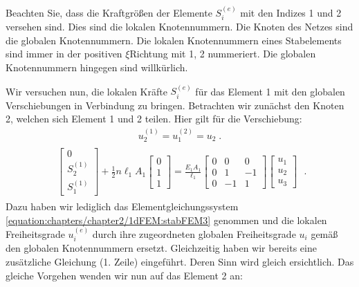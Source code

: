 \documentclass[letterpaper,10pt,german]{jupyterBook}
\begin{document}
\sphinxAtStartPar
Beachten Sie, dass die Kraftgrößen der Elemente \(S_i^{(e)}\) mit den Indizes 1 und 2 versehen sind. Dies sind die lokalen Knotennummern. Die Knoten des Netzes sind die globalen Knotennummern. Die lokalen Knotennummern eines Stabelements sind immer in der positiven \(\xi\)\sphinxhyphen{}Richtung mit 1, 2 nummeriert. Die globalen Knotennummern hingegen sind willkürlich.

\sphinxAtStartPar
Wir versuchen nun, die lokalen Kräfte \(S_i^{(e)}\) für das Element 1 mit den globalen Verschiebungen in Verbindung zu bringen. Betrachten wir zunächst den Knoten 2, welchen sich Element 1 und 2 teilen. Hier gilt für die Verschiebung:
\label{equation:chapters/chapter2/1dFEM:3deffa07-4eeb-4983-93bb-bf8bba989f7c}\begin{align}
  u_2^{(1)} = u_1^{(2)} = u_2 \; .
\end{align}\begin{equation}\label{equation:chapters/chapter2/1dFEM:stabFEM5}
\begin{split}\begin{align}
\begin{bmatrix}
0 \\
S_2^{(1)}\\
S_1^{(1)}
\end{bmatrix} + \frac{1}{2}n\ell_1 A_1 \begin{bmatrix}
0 \\
1\\
1
\end{bmatrix} = \frac{E_1A_1}{\ell_1}\begin{bmatrix}
0 & 0 & 0\\
0 & 1 & -1\\
0 & -1 & 1
\end{bmatrix} \begin{bmatrix}
u_1 \\
u_2\\
u_3
\end{bmatrix}
\end{align} \; .\end{split}
\end{equation}
\sphinxAtStartPar
Dazu haben wir lediglich das Elementgleichungssystem \eqref{equation:chapters/chapter2/1dFEM:stabFEM3} genommen und die lokalen Freiheitsgrade \(u_i^{(e)}\) durch ihre zugeordneten globalen Freiheitsgrade \(u_i\) gemäß den globalen Knotennummern ersetzt. Gleichzeitig haben wir bereits eine zusätzliche Gleichung (1. Zeile) eingeführt. Deren Sinn wird gleich ersichtlich. Das gleiche Vorgehen wenden wir nun auf das Element 2 an:
\end{document}
